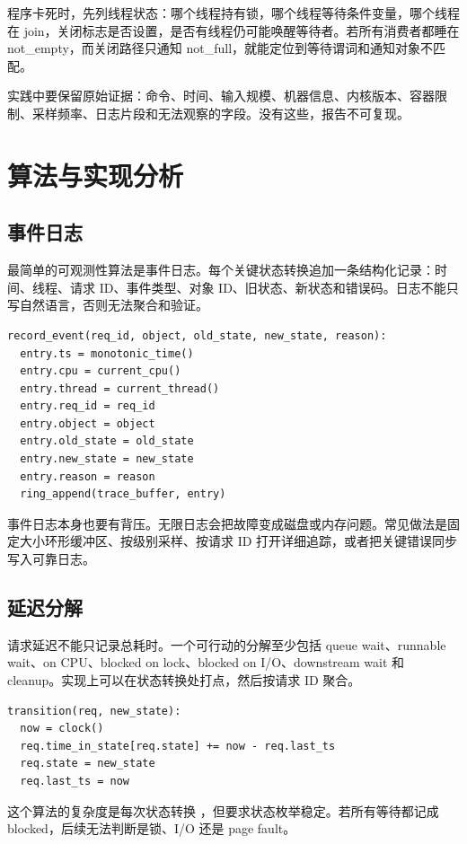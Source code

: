 程序卡死时，先列线程状态：哪个线程持有锁，哪个线程等待条件变量，哪个线程在 join，关闭标志是否设置，是否有线程仍可能唤醒等待者。若所有消费者都睡在 not\_empty，而关闭路径只通知 not\_full，就能定位到等待谓词和通知对象不匹配。

实践中要保留原始证据：命令、时间、输入规模、机器信息、内核版本、容器限制、采样频率、日志片段和无法观察的字段。没有这些，报告不可复现。

\section{算法与实现分析}

\subsection{事件日志}

最简单的可观测性算法是事件日志。每个关键状态转换追加一条结构化记录：时间、线程、请求 ID、事件类型、对象 ID、旧状态、新状态和错误码。日志不能只写自然语言，否则无法聚合和验证。

\begin{lstlisting}
record_event(req_id, object, old_state, new_state, reason):
  entry.ts = monotonic_time()
  entry.cpu = current_cpu()
  entry.thread = current_thread()
  entry.req_id = req_id
  entry.object = object
  entry.old_state = old_state
  entry.new_state = new_state
  entry.reason = reason
  ring_append(trace_buffer, entry)
\end{lstlisting}

事件日志本身也要有背压。无限日志会把故障变成磁盘或内存问题。常见做法是固定大小环形缓冲区、按级别采样、按请求 ID 打开详细追踪，或者把关键错误同步写入可靠日志。

\subsection{延迟分解}

请求延迟不能只记录总耗时。一个可行动的分解至少包括 queue wait、runnable wait、on CPU、blocked on lock、blocked on I/O、downstream wait 和 cleanup。实现上可以在状态转换处打点，然后按请求 ID 聚合。

\begin{lstlisting}
transition(req, new_state):
  now = clock()
  req.time_in_state[req.state] += now - req.last_ts
  req.state = new_state
  req.last_ts = now
\end{lstlisting}

这个算法的复杂度是每次状态转换 ，但要求状态枚举稳定。若所有等待都记成 blocked，后续无法判断是锁、I/O 还是 page fault。

